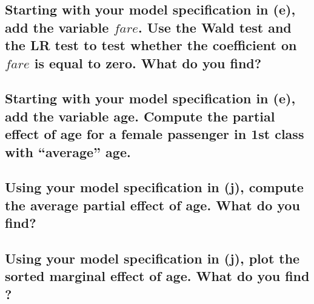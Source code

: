 \documentclass[12pt]{article}
\begin{document}
\subsection{Starting with your model specification in (e), add the variable $fare$. Use the Wald test and the LR test to test whether the coefficient on $fare$ is equal to zero. What do you find?}
\subsection{Starting with your model specification in (e), add the variable age. Compute the partial effect of age for a female passenger in 1st class with “average” age.}
\subsection{Using your model specification in (j), compute the average partial effect of age. What do you find?}
\subsection{Using your model specification in (j), plot the sorted marginal effect of age. What do you find ?}
\end{document}

